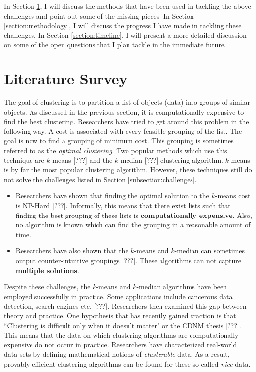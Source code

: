 \documentclass[11pt]{article}
\begin{document}
In Section \ref{section:literaturesurvey}, I will discuss the methods that have been used in tackling the above challenges and point out some of the missing pieces. In Section \ref{section:methodology}, I will discuss the progress I have made in tackling these challenges. In Section \ref{section:timeline}, I will present a more detailed discussion on some of the open questions that I plan tackle in the immediate future.

\section{Literature Survey}
\label{section:literaturesurvey}
The goal of clustering is to partition a list of objects (data) into groups of similar objects. As discussed in the previous section, it is computationally expensive to find the best clustering. Researchers have tried to get around this problem in the following way. A cost is associated with every feasible grouping of the list. The goal is now to find a grouping of minimum cost. This grouping is sometimes referred to as the \textit{optimal clustering}. Two popular methods which use this technique are $k$-means {\color{red} [???]} and the $k$-median {\color{red} [???]} clustering algorithm. $k$-means is by far the most popular clustering algorithm. However, these techniques still do not solve the challenges listed in Section \ref{subsection:challenges}. 
\begin{itemize}
\item Researchers have shown that finding the optimal solution to the $k$-means cost is NP-Hard {\color{red} [???]}.  Informally, this means that there exist lists such that finding the best grouping of these lists is \textbf{computationally expensive}.  Also, no algorithm is known which can find the grouping in a reasonable amount of time. 
\item Researchers have also shown that the $k$-means and $k$-median can sometimes output counter-intuitive groupings {\color{red} [???]}. These algorithms can not capture \textbf{multiple solutions}.
\end{itemize}
Despite these challenges, the $k$-means and $k$-median algorithms have been employed successfully in practice. Some applications include cancerous data detection, search engines etc. {\color{red} [???]}. Researchers then examined this gap between theory and practice. One hypothesis that has recently gained traction is that ``Clustering is difficult only when it doesn't matter" or the CDNM thesis {\color{red} [???]}. This means that the data on which clustering algorithms are computationally expensive do not occur in practice. Researchers have characterized real-world data sets by defining mathematical notions of \textit{clusterable} data. As a result, provably efficient clustering algorithms can be found for these so called {\em nice} data.  
\end{document}
